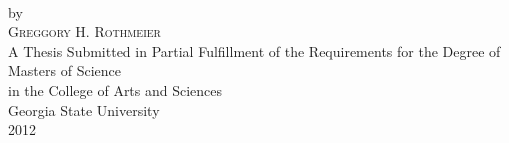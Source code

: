 \thispagestyle{empty}
\begin{titlepage}
\begin{center}
\vspace*{\fill}
{ \huge \thesisTitle } \\
\vspace{1.0in}
by \\
\vspace{1.0in}
{ \large \textsc{Greggory H. Rothmeier} } \\
\vspace{2.0in}
A Thesis Submitted in Partial Fulfillment of the Requirements for the Degree of\\
Masters of Science\\
in the College of Arts and Sciences\\
Georgia State University\\
2012\\
\vspace*{\fill}
\end{center}
\end{titlepage}